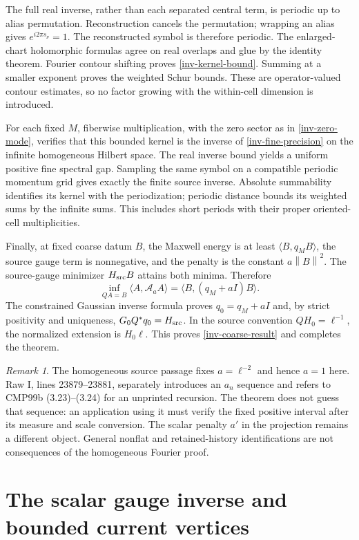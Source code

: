 \documentclass[11pt]{article}
\theoremstyle{remark}
\newtheorem{remark}[theorem]{Remark}
\newcommand{\norm}[1]{\left\|#1\right\|}
\begin{document}
The full real inverse, rather than each separated central term, is
periodic up to alias permutation. Reconstruction cancels the
permutation; wrapping an alias gives $e^{i2\pi s_\nu}=1$. The
reconstructed symbol is therefore periodic. The enlarged-chart
holomorphic formulas agree on real overlaps and glue by the identity
theorem. Fourier contour shifting proves \eqref{inv-kernel-bound}.
Summing at a smaller exponent proves the weighted Schur bounds.
These are operator-valued contour estimates, so no factor growing
with the within-cell dimension is introduced.

For each fixed $M$, fiberwise multiplication, with the zero sector
as in \eqref{inv-zero-mode}, verifies that this bounded kernel is
the inverse of \eqref{inv-fine-precision} on the infinite homogeneous
Hilbert space. The real inverse bound yields a uniform positive fine
spectral gap. Sampling the same symbol on a compatible periodic
momentum grid gives exactly the finite source inverse. Absolute
summability identifies its kernel with the periodization; periodic
distance bounds its weighted sums by the infinite sums. This includes
short periods with their proper oriented-cell multiplicities.

Finally, at fixed coarse datum $B$, the Maxwell energy is at least
$\langle B,q_MB\rangle$, the source gauge term is nonnegative, and
the penalty is the constant $a\norm{B}^2$. The source-gauge minimizer
$H_{\rm src}B$ attains both minima. Therefore
\[
 \inf_{QA=B}\langle A,\mathcal A_aA\rangle
   =\langle B,(q_M+aI)B\rangle.
\]
The constrained Gaussian inverse formula proves
$q_0=q_M+aI$ and, by strict positivity and uniqueness,
$G_0Q^*q_0=H_{\rm src}$. In the source convention
$QH_0=\ell^{-1}$, the normalized extension is $H_0\ell$.
This proves \eqref{inv-coarse-result} and completes the theorem.

\begin{remark}\label{inv-scope}
The homogeneous source passage fixes $a=\ell^{-2}$ and hence $a=1$
here. Raw I, lines 23879--23881, separately introduces an $a_n$
sequence and refers to CMP99b (3.23)--(3.24) for an unprinted recursion.
The theorem does not guess that sequence: an application using it
must verify the fixed positive interval after its measure and scale
conversion. The scalar penalty $a'$ in the projection remains a
different object. General nonflat and retained-history identifications
are not consequences of the homogeneous Fourier proof.
\end{remark}
\section{The scalar gauge inverse and bounded current vertices}
\label{gauge-section}
\end{document}
